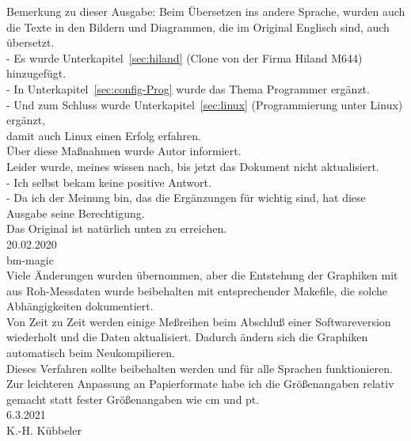 Bemerkung zu dieser Ausgabe:
\vspace*{0.3cm}
Beim Übersetzen ins andere Sprache, wurden auch die Texte in den Bildern und Diagrammen,
die im Original Englisch sind, auch übersetzt.
\\- Es wurde Unterkapitel~\ref{sec:hiland} (Clone von der Firma Hiland M644) hinzugefügt.
\\- In Unterkapitel~\ref{sec:config-Prog} wurde das Thema Programmer ergänzt.
\\- Und zum Schluss wurde Unterkapitel~\ref{sec:linux} (Programmierung unter Linux) ergänzt,
\\damit auch Linux  einen Erfolg erfahren.
\vspace*{0.3cm}
\\Über diese Maßnahmen wurde Autor informiert.
\\Leider wurde, meines wissen nach, bis jetzt das Dokument nicht aktualisiert.
\\- Ich selbst bekam keine positive Antwort.
\\- Da ich der Meinung bin, das die Ergänzungen für  wichtig sind, hat diese Ausgabe seine Berechtigung.
\vspace*{0.3cm}
\\Das Original ist natürlich unten \cite{khk} zu erreichen.
\vspace*{0.2cm}
\\20.02.2020
\vspace*{0.2cm}
\\ bm-magic
\vspace*{0.2cm}
\\Viele Änderungen wurden übernommen, aber die Entstehung der Graphiken mit  aus Roh-Messdaten
wurde beibehalten mit entsprechender Makefile, die solche Abhängigkeiten dokumentiert.\\
Von Zeit zu Zeit werden einige Meßreihen beim Abschluß einer Softwareversion wiederholt und
die Daten aktualisiert. Dadurch ändern sich die Graphiken automatisch beim Neukompilieren.\\
Dieses Verfahren sollte beibehalten werden und für alle Sprachen funktionieren.\\
Zur leichteren Anpassung an Papierformate habe ich die Größenangaben relativ gemacht statt
fester Größenangaben wie cm und pt.
\vspace*{0.2cm}
\\6.3.2021
\\K.-H. Kübbeler
\vspace*{0.2cm}

